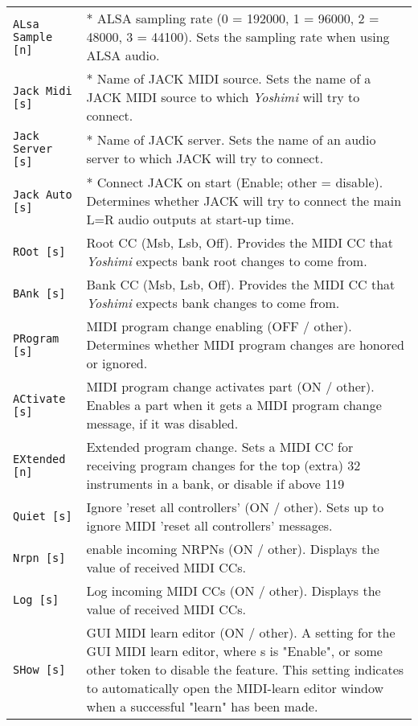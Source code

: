\begin{center}
\begin{longtable}{p{4cm} p{10cm}}
\texttt{ALsa Sample [n]} &
   * ALSA sampling rate (0 = 192000, 1 = 96000, 2 = 48000, 3 = 44100).
   Sets the sampling rate when using ALSA audio. \\
\texttt{Jack Midi [s]} &
   * Name of JACK MIDI source.
   Sets the name of a JACK MIDI source to which
   \textsl{Yoshimi} will try to connect.  \\
\texttt{Jack Server [s]} &
   * Name of JACK server.
   Sets the name of an audio server to which JACK will try to connect. \\
\texttt{Jack Auto [s]} &
   * Connect JACK on start (Enable; other = disable).
   Determines whether JACK will try to connect the main L=R audio outputs at
   start-up time. \\
\texttt{ROot [s]} &
   Root CC (Msb, Lsb, Off).
   Provides the MIDI CC that \textsl{Yoshimi} expects bank root changes to come
   from.  \\
\texttt{BAnk [s]} &
   Bank CC (Msb, Lsb, Off).
   Provides the MIDI CC that \textsl{Yoshimi} expects
   bank changes to come from.  \\
\texttt{PRogram [s]} &
   MIDI program change enabling (OFF / other).
   Determines whether MIDI program changes are honored or ignored.  \\
\texttt{ACtivate [s]} &
   MIDI program change activates part (ON / other).
   Enables a part when it gets a MIDI program change message,
   if it was disabled.  \\
\texttt{EXtended [n]} &
   Extended program change.
   Sets a MIDI CC for receiving program changes for the top (extra)
   32 instruments in a bank, or disable if above 119  \\
\texttt{Quiet [s]} &
   Ignore 'reset all controllers' (ON / other).
   Sets up to ignore MIDI 'reset all controllers' messages. \\
\texttt{Nrpn [s]} &
   enable incoming NRPNs (ON / other).
   Displays the value of received MIDI CCs. \\
\texttt{Log [s]} &
   Log incoming MIDI CCs (ON / other).
   Displays the value of received MIDI CCs. \\
\texttt{SHow [s]} &
   GUI MIDI learn editor (ON / other).
   A setting for the GUI MIDI learn editor, where s is "Enable", or some
   other token to disable the feature.
   This setting indicates to automatically open the MIDI-learn editor window
   when a successful "learn" has been made.  \\

\end{longtable}
\end{center}


